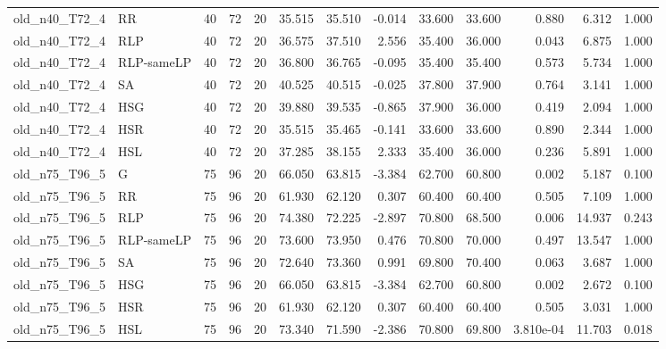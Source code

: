 \begin{table}[htbp]
\begin{tabular}{llrrrrrrrrrrr}
old\_n40\_T72\_4 & RR & 40 & 72 & 20 & 35.515 & 35.510 & -0.014 & 33.600 & 33.600 & 0.880 & 6.312 & 1.000 \\
old\_n40\_T72\_4 & RLP & 40 & 72 & 20 & 36.575 & 37.510 & 2.556 & 35.400 & 36.000 & 0.043 & 6.875 & 1.000 \\
old\_n40\_T72\_4 & RLP-sameLP & 40 & 72 & 20 & 36.800 & 36.765 & -0.095 & 35.400 & 35.400 & 0.573 & 5.734 & 1.000 \\
old\_n40\_T72\_4 & SA & 40 & 72 & 20 & 40.525 & 40.515 & -0.025 & 37.800 & 37.900 & 0.764 & 3.141 & 1.000 \\
old\_n40\_T72\_4 & HSG & 40 & 72 & 20 & 39.880 & 39.535 & -0.865 & 37.900 & 36.000 & 0.419 & 2.094 & 1.000 \\
old\_n40\_T72\_4 & HSR & 40 & 72 & 20 & 35.515 & 35.465 & -0.141 & 33.600 & 33.600 & 0.890 & 2.344 & 1.000 \\
old\_n40\_T72\_4 & HSL & 40 & 72 & 20 & 37.285 & 38.155 & 2.333 & 35.400 & 36.000 & 0.236 & 5.891 & 1.000 \\
old\_n75\_T96\_5 & G & 75 & 96 & 20 & 66.050 & 63.815 & -3.384 & 62.700 & 60.800 & 0.002 & 5.187 & 0.100 \\
old\_n75\_T96\_5 & RR & 75 & 96 & 20 & 61.930 & 62.120 & 0.307 & 60.400 & 60.400 & 0.505 & 7.109 & 1.000 \\
old\_n75\_T96\_5 & RLP & 75 & 96 & 20 & 74.380 & 72.225 & -2.897 & 70.800 & 68.500 & 0.006 & 14.937 & 0.243 \\
old\_n75\_T96\_5 & RLP-sameLP & 75 & 96 & 20 & 73.600 & 73.950 & 0.476 & 70.800 & 70.000 & 0.497 & 13.547 & 1.000 \\
old\_n75\_T96\_5 & SA & 75 & 96 & 20 & 72.640 & 73.360 & 0.991 & 69.800 & 70.400 & 0.063 & 3.687 & 1.000 \\
old\_n75\_T96\_5 & HSG & 75 & 96 & 20 & 66.050 & 63.815 & -3.384 & 62.700 & 60.800 & 0.002 & 2.672 & 0.100 \\
old\_n75\_T96\_5 & HSR & 75 & 96 & 20 & 61.930 & 62.120 & 0.307 & 60.400 & 60.400 & 0.505 & 3.031 & 1.000 \\
old\_n75\_T96\_5 & HSL & 75 & 96 & 20 & 73.340 & 71.590 & -2.386 & 70.800 & 69.800 & 3.810e-04 & 11.703 & 0.018 \\
\bottomrule
\end{tabular}
\end{table}
